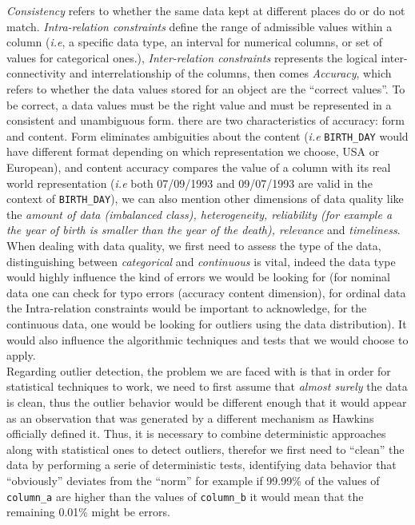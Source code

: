 \documentclass{article}
\begin{document}
\textit{Consistency} refers to whether the same data kept at different places do or do not match. \textit{Intra-relation constraints} define the range of admissible values within a column (\textit{i.e}, a specific data type, an interval for numerical columns, or set of values for categorical ones.), \textit{Inter-relation constraints} represents the logical inter-connectivity and interrelationship of the columns, then comes \textit{Accuracy}, which refers to whether the data values stored for an object are the ``correct values''. To be correct, a data values must be the right value and must be represented in a consistent and unambiguous form. there are two characteristics of accuracy: form and content. Form eliminates ambiguities about the content (\textit{i.e} \texttt{BIRTH\_DAY} would have different format depending on which representation we choose, USA or European), and content accuracy compares the value of a column with its real world representation (\textit{i.e} both 07/09/1993 and 09/07/1993 are valid in the context of \texttt{BIRTH\_DAY}), we can also mention other dimensions of data quality like the \textit{amount of data (imbalanced class), heterogeneity, reliability (for example a the year of birth is smaller than the year of the death), relevance} and \textit{timeliness}. \\
When dealing with data quality, we first need to assess the type of the data, distinguishing between \textit{categorical} and \textit{continuous} is vital, indeed the data type would highly influence the kind of errors we would be looking for (for nominal data one can check for typo errors (accuracy content dimension), for ordinal data the Intra-relation constraints would be important to acknowledge, for the continuous data, one would be looking for outliers using the data distribution). It would also influence the algorithmic techniques and tests that we would choose to apply. \\

Regarding outlier detection, the problem we are faced with is that in order for statistical techniques to work, we need to first assume that \textit{almost surely} the data is clean, thus the outlier behavior would be different enough that it would appear as an observation that was generated by a different mechanism as Hawkins officially defined it. Thus, it is necessary to combine deterministic approaches along with statistical ones to detect outliers, therefor we first need to ``clean'' the data by performing a serie of deterministic tests, identifying data behavior that ``obviously'' deviates from the ``norm'' for example if 99.99\% of the values of \texttt{column_a} are higher than the values of \texttt{column_b} it would mean that the remaining 0.01\% might be errors.\\
\end{document}
